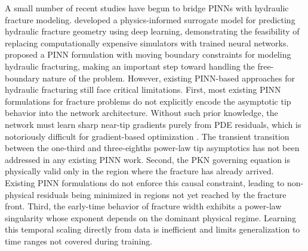 \documentclass[a4paper,fleqn]{cas-sc}
\begin{document}
A small number of recent studies have begun to bridge PINNs with
hydraulic fracture modeling. \citet{Yang2023} developed a
physics-informed surrogate model for predicting hydraulic fracture
geometry using deep learning, demonstrating the feasibility of replacing
computationally expensive simulators with trained neural networks.
\citet{Tang2024} proposed a PINN formulation with moving boundary
constraints for modeling hydraulic fracturing, making an important step
toward handling the free-boundary nature of the problem. However,
existing PINN-based approaches for hydraulic fracturing still face
critical limitations. First, most existing PINN formulations for
fracture problems do not explicitly encode the asymptotic tip behavior
into the network architecture. Without such prior knowledge, the network
must learn sharp near-tip gradients purely from PDE residuals, which is
notoriously difficult for gradient-based optimization
\cite{Krishnapriyan2021}. The transient transition between the
one-third and three-eighths power-law tip asymptotics has not been
addressed in any existing PINN work. Second, the PKN governing equation
is physically valid only in the region where the fracture has already
arrived. Existing PINN formulations do not enforce this causal
constraint, leading to non-physical residuals being minimized in regions
not yet reached by the fracture front. Third, the early-time behavior
of fracture width exhibits a power-law singularity whose exponent
depends on the dominant physical regime. Learning this temporal scaling
directly from data is inefficient and limits generalization to time
ranges not covered during training.
\end{document}

